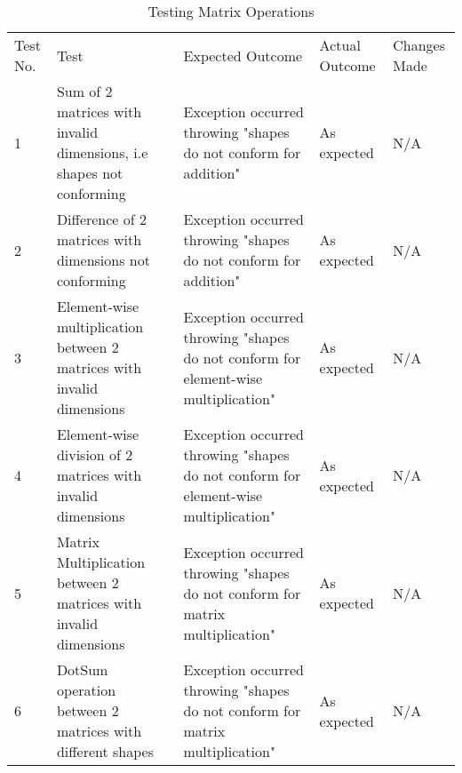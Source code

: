 \begin{table}[H]
\centering
    \begin{tabular}{|p{1cm}|p{4cm}|p{4cm}|p{3cm}|p{2cm}|}
        \hline
        Test No. & Test & Expected Outcome & Actual Outcome & Changes Made \\ \cline{1-5} 
        1 & Sum of 2 matrices with invalid dimensions, i.e shapes not conforming & Exception occurred throwing "shapes do not conform for addition" & As expected & N/A \\
        \cline{1-5}
        2 & Difference of 2 matrices with dimensions not conforming & Exception occurred throwing "shapes do not conform for addition" & As expected & N/A \\
        \cline{1-5}
        3 & Element-wise multiplication between 2 matrices with invalid dimensions & Exception occurred throwing "shapes do not conform for element-wise multiplication" & As expected & N/A \\
        \cline{1-5}
        4 & Element-wise division of 2 matrices with invalid dimensions & Exception occurred throwing "shapes do not conform for element-wise multiplication" & As expected & N/A \\
        \cline{1-5}
        5 & Matrix Multiplication between 2 matrices with invalid dimensions & Exception occurred throwing "shapes do not conform for matrix multiplication" & As expected & N/A \\
        \cline{1-5}
        6 & DotSum operation between 2 matrices with different shapes & Exception occurred throwing "shapes do not conform for matrix multiplication" & As expected & N/A \\
        \cline{1-5}
    \end{tabular}
    \caption{Testing Matrix Operations}
    \vspace{0.5cm}
\end{table}




